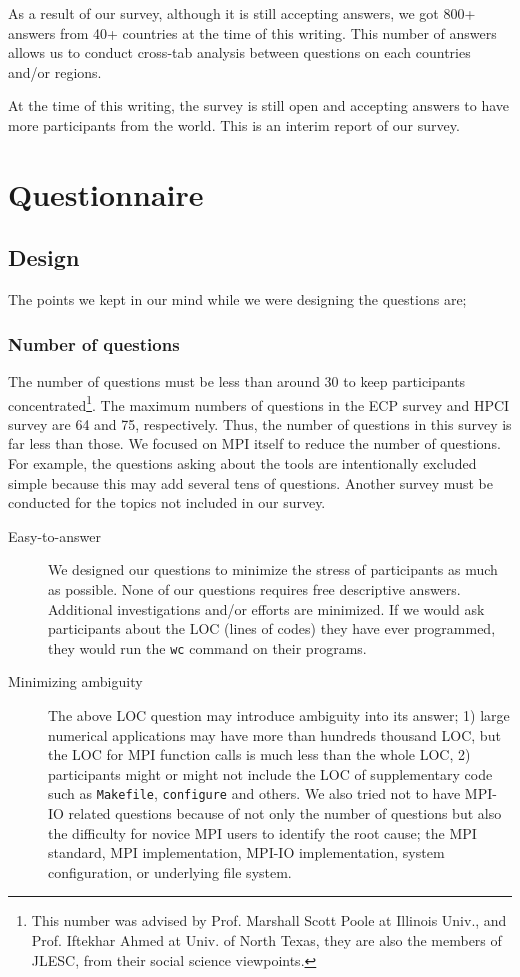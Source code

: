 \documentclass[submit,techrep,noauthor,english]{ipsj}
\begin{document}
As a result of our survey, although it is still accepting answers, we
got 800+ answers from 40+ countries at the time of this writing.  This
number of answers allows us to conduct cross-tab analysis between
questions on each countries and/or regions.

At the time of this writing, the survey is still open and accepting
answers to have more participants from the world. This is an interim
report of our survey.

\section{Questionnaire}

\subsection{Design}

The points we kept in our mind while we were designing the
questions are; 

\subsubsection*{Number of questions}
The number of questions must be less than around 30
to keep participants concentrated\footnote{This
  number was advised by Prof. Marshall Scott Poole at Illinois Univ.,
  and Prof. Iftekhar Ahmed at Univ. of North Texas, they are also
  the members of JLESC\cite{JLESC}, from their social science viewpoints.}.
The maximum numbers of questions in the ECP survey and HPCI survey are
64 and 75, respectively. Thus, the number of questions in this survey
is far less than those.  We focused on MPI itself to reduce the number
of questions.  For example, the questions asking about the tools are
intentionally excluded simple because this may add several tens of
questions. Another survey must be conducted for the topics not
included in our survey.

\begin{description}
\item[Easy-to-answer]
We designed our questions to minimize the stress of participants as
much as possible. None of our questions requires free descriptive
answers. Additional investigations and/or efforts are minimized. If we
would ask participants about the LOC (lines of codes) they have ever
programmed, they would run the {\tt wc} command on their programs.  

\item[Minimizing ambiguity]
The above LOC question may introduce ambiguity into its answer; 1)
large numerical applications may have more than hundreds thousand LOC,
but the LOC for MPI function calls is much less than the whole LOC, 2)
participants might or might not include the LOC of supplementary code
such as {\tt Makefile}, {\tt configure} and others. 
We also tried not to have MPI-IO related questions because of not only
the number of questions but also the difficulty for novice MPI users
to identify the root cause; the MPI standard, MPI implementation,
MPI-IO implementation, system configuration, or underlying file
system. 
\end{description}
\end{document}
